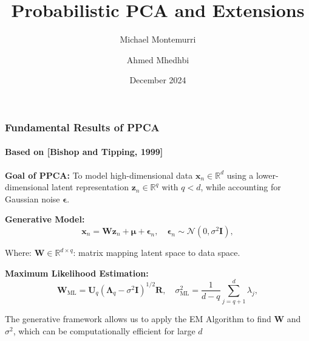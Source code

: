 \documentclass{beamer}
\title{Probabilistic PCA and Extensions}
\author[Montemurri and Mhedhbi]
{Michael Montemurri\inst{1} \and Ahmed Mhedhbi\inst{2}}
\institute[Short Institute Name]{
    \inst{1} McGill University \\
    \inst{2} Université de Montréal
}
\date{December 2024}
\begin{document}
\begin{frame}
    \titlepage
\end{frame}

\begin{frame}
    \frametitle{Fundamental Results of PPCA}
    \framesubtitle{\footnotesize Based on [Bishop and Tipping, 1999]}
\textbf{Goal of PPCA:}
To model high-dimensional data \( \mathbf{x}_n \in \mathbb{R}^d \) using a lower-dimensional latent representation \( \mathbf{z}_n \in \mathbb{R}^q \) with \( q < d \), while accounting for Gaussian noise \( \boldsymbol{\epsilon} \).

\vspace{1em}
\textbf{Generative Model:}
\[
    \mathbf{x}_n = \mathbf{W}\mathbf{z}_n + \boldsymbol{\mu} + \boldsymbol{\epsilon}_n, \quad \boldsymbol{\epsilon}_n \sim \mathcal{N}(0, \sigma^2 \mathbf{I}),
\]

 Where: \( \mathbf{W} \in \mathbb{R}^{d \times q} \): matrix mapping latent space to data space.


\vspace{1em}

\textbf{Maximum Likelihood Estimation:}
\[
    \mathbf{W}_{\text{ML}} = \mathbf{U}_q(\boldsymbol{\Lambda}_q - \sigma^2\mathbf{I})^{1/2}\mathbf{R}, \quad \sigma^2_{\text{ML}} = \frac{1}{d - q} \sum_{j=q+1}^d \lambda_j,
\]

The generative framework allows us to apply the EM Algorithm to find $\mathbf{W}$ and $\sigma^2$, which can be computationally efficient for large $d$

\end{frame}

\end{document}
